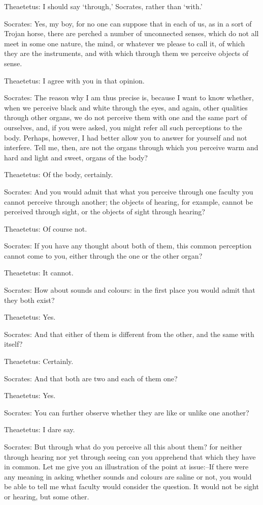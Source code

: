 Theaetetus: I should say `through,' Socrates, rather than `with.'

Socrates: Yes, my boy, for no one can suppose that in each of us, as
in a sort of Trojan horse, there are perched a number of unconnected
senses, which do not all meet in some one nature, the mind, or whatever
we please to call it, of which they are the instruments, and with which
through them we perceive objects of sense.

Theaetetus: I agree with you in that opinion.

Socrates: The reason why I am thus precise is, because I want to know
whether, when we perceive black and white through the eyes, and again,
other qualities through other organs, we do not perceive them with one
and the same part of ourselves, and, if you were asked, you might refer
all such perceptions to the body. Perhaps, however, I had better allow
you to answer for yourself and not interfere. Tell me, then, are not
the organs through which you perceive warm and hard and light and sweet,
organs of the body?

Theaetetus: Of the body, certainly.

Socrates: And you would admit that what you perceive through one
faculty you cannot perceive through another; the objects of hearing,
for example, cannot be perceived through sight, or the objects of sight
through hearing?

Theaetetus: Of course not.

Socrates: If you have any thought about both of them, this common
perception cannot come to you, either through the one or the other
organ?

Theaetetus: It cannot.

Socrates: How about sounds and colours: in the first place you would
admit that they both exist?

Theaetetus: Yes.

Socrates: And that either of them is different from the other, and the
same with itself?

Theaetetus: Certainly.

Socrates: And that both are two and each of them one?

Theaetetus: Yes.

Socrates: You can further observe whether they are like or unlike one
another?

Theaetetus: I dare say.

Socrates: But through what do you perceive all this about them? for
neither through hearing nor yet through seeing can you apprehend that
which they have in common. Let me give you an illustration of the
point at issue:--If there were any meaning in asking whether sounds and
colours are saline or not, you would be able to tell me what faculty
would consider the question. It would not be sight or hearing, but some
other.

